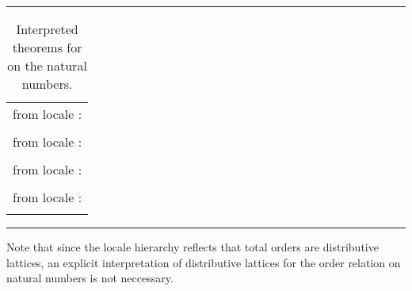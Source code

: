 \begin{isabellebody}
\begin{isamarkuptext}
\begin{table}
\hrule
\vspace{2ex}
\begin{center}
\begin{tabular}{l}
  \isa{nat{\isachardot}less{\isacharunderscore}def} from locale \isa{partial{\isacharunderscore}order}: \\
  \quad \isa{{\isacharparenleft}{\isacharquery}x\ {\isacharless}\ {\isacharquery}y{\isacharparenright}\ {\isacharequal}\ {\isacharparenleft}{\isacharquery}x\ {\isasymle}\ {\isacharquery}y\ {\isasymand}\ {\isacharquery}x\ {\isasymnoteq}\ {\isacharquery}y{\isacharparenright}} \\
  \isa{nat{\isachardot}meet{\isacharunderscore}left} from locale \isa{lattice}: \\
  \quad \isa{min\ {\isacharquery}x\ {\isacharquery}y\ {\isasymle}\ {\isacharquery}x} \\
  \isa{nat{\isachardot}join{\isacharunderscore}distr} from locale \isa{distrib{\isacharunderscore}lattice}: \\
  \quad \isa{lattice{\isachardot}join\ op\ {\isasymle}\ {\isacharquery}x\ {\isacharparenleft}lattice{\isachardot}meet\ op\ {\isasymle}\ {\isacharquery}y\ {\isacharquery}z{\isacharparenright}\ {\isacharequal}\ lattice{\isachardot}meet\ op\ {\isasymle}\ {\isacharparenleft}lattice{\isachardot}join\ op\ {\isasymle}\ {\isacharquery}x\ {\isacharquery}y{\isacharparenright}\ {\isacharparenleft}lattice{\isachardot}join\ op\ {\isasymle}\ {\isacharquery}x\ {\isacharquery}z{\isacharparenright}} \\
  \isa{nat{\isachardot}less{\isacharunderscore}total} from locale \isa{total{\isacharunderscore}order}: \\
  \quad \isa{partial{\isacharunderscore}order{\isachardot}less\ op\ {\isasymle}\ {\isacharquery}x\ {\isacharquery}y\ {\isasymor}\ {\isacharquery}x\ {\isacharequal}\ {\isacharquery}y\ {\isasymor}\ partial{\isacharunderscore}order{\isachardot}less\ op\ {\isasymle}\ {\isacharquery}y\ {\isacharquery}x}
\end{tabular}
\end{center}
\hrule
\caption{Interpreted theorems for \isa{{\isasymle}} on the natural numbers.}
\label{tab:nat-lattice}
\end{table}

  Note that since the locale hierarchy reflects that total orders are
  distributive lattices, an explicit interpretation of distributive
  lattices for the order relation on natural numbers is not neccessary.


\end{isamarkuptext}
\end{isabellebody}

